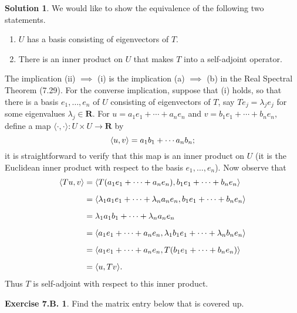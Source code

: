 \documentclass[12pt]{article}
\theoremstyle{definition}
\theoremstyle{exercise}
\newtheorem{exercise}{Exercise 7.B.}
\theoremstyle{solution}
\newtheorem*{solution}{Solution}
\newcommand{\ipanon}{\langle \cdot, \cdot \rangle}
\newcommand{\R}{\mathbf{R}}
\DeclarePairedDelimiter\ip{\langle}{\rangle}
\begin{document}
\begin{solution}
    We would like to show the equivalence of the following two statements.
    \begin{enumerate}[label=(\roman*)]
        \item \( U \) has a basis consisting of eigenvectors of \( T \).

        \item There is an inner product on \( U \) that makes \( T \) into a self-adjoint operator.
    \end{enumerate}
    The implication (ii) \( \implies \) (i) is the implication (a) \( \implies \) (b) in the Real Spectral Theorem (7.29). For the converse implication, suppose that (i) holds, so that there is a basis \( e_1, \ldots, e_n \) of \( U \) consisting of eigenvectors of \( T \), say \( Te_j = \lambda_j e_j \) for some eigenvalues \( \lambda_j \in \R \). For \( u = a_1 e_1 + \cdots + a_n e_n \) and \( v = b_1 e_1 + \cdots + b_n e_n \), define a map \( \ipanon : U \times U \to \R \) by
    \[
        \ip{u, v} = a_1 b_1 + \cdots a_n b_n;
    \]
    it is straightforward to verify that this map is an inner product on \( U \) (it is the Euclidean inner product with respect to the basis \( e_1, \ldots, e_n \)). Now observe that
    \begin{align*}
        \ip{Tu, v} &= \ip{T(a_1 e_1 + \cdots + a_n e_n), b_1 e_1 + \cdots + b_n e_n} \\[2mm]
        &= \ip{\lambda_1 a_1 e_1 + \cdots + \lambda_n a_n e_n, b_1 e_1 + \cdots + b_n e_n} \\[2mm]
        &= \lambda_1 a_1 b_1 + \cdots + \lambda_n a_n e_n \\[2mm]
        &= \ip{a_1 e_1 + \cdots + a_n e_n, \lambda_1 b_1 e_1 + \cdots + \lambda_n b_n e_n} \\[2mm]
        &= \ip{a_1 e_1 + \cdots + a_n e_n, T(b_1 e_1 + \cdots + b_n e_n)} \\[2mm]
        &= \ip{u, Tv}.
    \end{align*}
    Thus \( T \) is self-adjoint with respect to this inner product.
\end{solution}

\begin{exercise}
\label{ex:15}
    Find the matrix entry below that is covered up.
\end{exercise}
\end{document}
